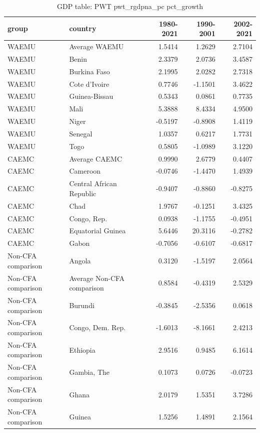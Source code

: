 \begin{table}

\caption{GDP table: PWT pwt_rgdpna_pc pct_growth}
\centering
\begin{tabular}[t]{llrrr}
\toprule
group & country & 1980-2021 & 1990-2001 & 2002-2021\\
\midrule
WAEMU & Average WAEMU & 1.5414 & 1.2629 & 2.7104\\
WAEMU & Benin & 2.3379 & 2.0736 & 3.4587\\
WAEMU & Burkina Faso & 2.1995 & 2.0282 & 2.7318\\
WAEMU & Cote d'Ivoire & 0.7746 & -1.1501 & 3.4622\\
WAEMU & Guinea-Bissau & 0.5343 & 0.0861 & 0.7735\\
\addlinespace
WAEMU & Mali & 5.3888 & 8.4334 & 4.9500\\
WAEMU & Niger & -0.5197 & -0.8908 & 1.4119\\
WAEMU & Senegal & 1.0357 & 0.6217 & 1.7731\\
WAEMU & Togo & 0.5805 & -1.0989 & 3.1220\\
CAEMC & Average CAEMC & 0.9990 & 2.6779 & 0.4407\\
\addlinespace
CAEMC & Cameroon & -0.0746 & -1.4470 & 1.4939\\
CAEMC & Central African Republic & -0.9407 & -0.8860 & -0.8275\\
CAEMC & Chad & 1.9767 & -0.1251 & 3.4325\\
CAEMC & Congo, Rep. & 0.0938 & -1.1755 & -0.4951\\
CAEMC & Equatorial Guinea & 5.6446 & 20.3116 & -0.2782\\
\addlinespace
CAEMC & Gabon & -0.7056 & -0.6107 & -0.6817\\
Non-CFA comparison & Angola & 0.3120 & -1.5197 & 2.0564\\
Non-CFA comparison & Average Non-CFA comparison & 0.8584 & -0.4319 & 2.5329\\
Non-CFA comparison & Burundi & -0.3845 & -2.5356 & 0.0618\\
Non-CFA comparison & Congo, Dem. Rep. & -1.6013 & -8.1661 & 2.4213\\
\addlinespace
Non-CFA comparison & Ethiopia & 2.9516 & 0.9485 & 6.1614\\
Non-CFA comparison & Gambia, The & 0.1073 & 0.0726 & -0.0723\\
Non-CFA comparison & Ghana & 2.0179 & 1.5351 & 3.7286\\
Non-CFA comparison & Guinea & 1.5256 & 1.4891 & 2.1564\\

\end{tabular}
\end{table}
